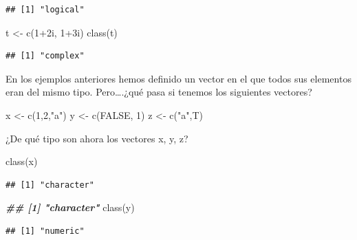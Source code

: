\documentclass[
]{book}
\newenvironment{Shaded}{\begin{snugshade}}{\end{snugshade}}
\newcommand{\ConstantTok}[1]{\textcolor[rgb]{0.00,0.00,0.00}{#1}}
\newcommand{\DecValTok}[1]{\textcolor[rgb]{0.00,0.00,0.81}{#1}}
\newcommand{\DocumentationTok}[1]{\textcolor[rgb]{0.56,0.35,0.01}{\textbf{\textit{#1}}}}
\newcommand{\FunctionTok}[1]{\textcolor[rgb]{0.00,0.00,0.00}{#1}}
\newcommand{\NormalTok}[1]{#1}
\newcommand{\OtherTok}[1]{\textcolor[rgb]{0.56,0.35,0.01}{#1}}
\newcommand{\SpecialCharTok}[1]{\textcolor[rgb]{0.00,0.00,0.00}{#1}}
\newcommand{\StringTok}[1]{\textcolor[rgb]{0.31,0.60,0.02}{#1}}
\begin{document}
\begin{verbatim}
## [1] "logical"
\end{verbatim}

\begin{Shaded}
\begin{Highlighting}[]
\NormalTok{t }\OtherTok{\textless{}{-}} \FunctionTok{c}\NormalTok{(}\DecValTok{1}\SpecialCharTok{+}\NormalTok{2i, }\DecValTok{1}\SpecialCharTok{+}\NormalTok{3i)}
\FunctionTok{class}\NormalTok{(t)}
\end{Highlighting}
\end{Shaded}

\begin{verbatim}
## [1] "complex"
\end{verbatim}

En los ejemplos anteriores hemos definido un vector en el que todos sus elementos eran del mismo tipo. Pero\ldots.¿qué pasa si tenemos los siguientes vectores?

\begin{Shaded}
\begin{Highlighting}[]
\NormalTok{x }\OtherTok{\textless{}{-}} \FunctionTok{c}\NormalTok{(}\DecValTok{1}\NormalTok{,}\DecValTok{2}\NormalTok{,}\StringTok{"a"}\NormalTok{)}
\NormalTok{y }\OtherTok{\textless{}{-}} \FunctionTok{c}\NormalTok{(}\ConstantTok{FALSE}\NormalTok{, }\DecValTok{1}\NormalTok{)}
\NormalTok{z }\OtherTok{\textless{}{-}} \FunctionTok{c}\NormalTok{(}\StringTok{"a"}\NormalTok{,T)}
\end{Highlighting}
\end{Shaded}

¿De qué tipo son ahora los vectores x, y, z?

\begin{Shaded}
\begin{Highlighting}[]
\FunctionTok{class}\NormalTok{(x)}
\end{Highlighting}
\end{Shaded}

\begin{verbatim}
## [1] "character"
\end{verbatim}

\begin{Shaded}
\begin{Highlighting}[]
\DocumentationTok{\#\# [1] "character"}
\FunctionTok{class}\NormalTok{(y)}
\end{Highlighting}
\end{Shaded}

\begin{verbatim}
## [1] "numeric"
\end{verbatim}
\end{document}
